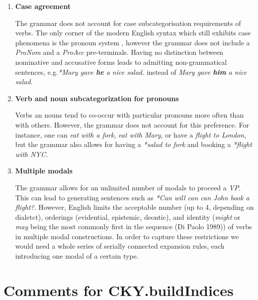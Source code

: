 \documentclass{article}
\begin{document}
\begin{enumerate}
		\item
		\textbf{Case agreement}
		
		The grammar does not account for case subcategorisation requirements of verbs. The only corner of the modern English syntax which still exhibits case phenomena is the pronoun system \cite{pullum2002cgel}, however the grammar does not include a \emph{ProNom} and a \emph{ProAcc} pre-terminals. Having no distinction between nominative and accusative forms leads to admitting non-grammatical sentences, e.g.\emph{*Mary gave \textbf{he} a nice salad.} instead of \emph{Mary gave \textbf{him} a nice salad.}
		
		\item
		\textbf{Verb and noun subcategorization for pronouns}
		
		Verbs an nouns tend to co-occur with particular pronouns more often than with others. However, the grammar does not account for this preference. For instance, one can \emph{eat with a fork}, \emph{eat with Mary}, or have a \emph{flight to London}, but the grammar also allows for having a \emph{*salad to fork} and booking a \emph{*flight with NYC.}
		
		\item
		\textbf{Multiple modals}
		
		The grammar allows for an unlimited number of modals to proceed a \emph{VP}. This can lead to generating sentences such as \emph{*Can will can can John book a flight?}. However, English limits the acceptable number (up to 4, depending on dialetct), orderings (evidential, epistemic, deontic), and identity (\emph{might} or \emph{may} being the most commonly first in the sequence (Di Paolo 1989)) of verbs in multiple modal constructions. In order to capture these restrictions we would need a whole series of serially connected expansion rules, each introducing one modal of a certain type.
		\end{enumerate}


\section{Comments for CKY.buildIndices}
\end{document}
